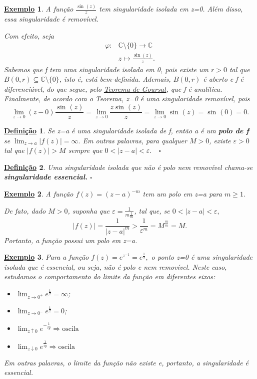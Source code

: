 \documentclass{article}
\newtheorem*{def*}{\underline{Defini\c c\~ao}}
\newtheorem{example}{\underline{Exemplo}}[section]
\begin{document}
  \begin{example}
    A função \(\frac{\sin^{}{(z)}}{z}\) tem singularidade isolada em z=0. Além disso, essa singularidade é removível.

    Com efeito, seja 
    \begin{align*}
      \varphi :&\mathbb{C}\setminus{\{0\}}\rightarrow \mathbb{C}\\
               &z\mapsto \frac{\sin{(z)}}{z}.
    \end{align*}
    Sabemos que f tem uma singularidade isolada em 0, pois existe um \(r > 0\) tal que \(B(0, r)\subseteq \mathbb{C}\setminus{\{0\}}\), isto é, está bem-definida. Ademais, \(B(0, r)\) é aberto 
    e f é diferenciável, do que segue, pelo \hyperlink{goursat}{Teorema de Goursat}, que f é analítica. Finalmente, de acordo com o Teorema, z=0 é uma singularidade removível, pois 
    \[
      \lim_{z\to 0}(z-0)\frac{\sin^{}{(z)}}{z} = \lim_{z\to 0}\frac{z\sin^{}{(z)}}{z} = \lim_{z\to 0}\sin^{}{(z)} = \sin^{}{(0)} = 0.
    \]
  \end{example}
  \begin{def*}
    Se z=a é uma singularidade isolada de f, então a é um \textbf{polo de f} se \(\lim_{z\to a}|f(z)| = \infty.\) Em outras palavras,
    para qualquer \(M > 0\), existe \(\varepsilon > 0\) tal que \(|f(z)| > M\) sempre que \(0 < |z-a| < \varepsilon .\quad \square\) 
  \end{def*}
  \begin{def*}
    Uma singularidade isolada que não é polo nem removível chama-se \textbf{singularidade essencial.} \(\square\)
  \end{def*}
  \begin{example}
    A função \(f(z) = (z-a)^{-m}\) tem um polo em z=a para \(m\geq 1\).

    De fato, dado \(M > 0\), suponha que \(\varepsilon  = \frac{1}{m \frac{1}{m}}\), tal que, se \(0 < |z-a| < \varepsilon ,\)
    \[
      |f(z)| = \frac{1}{|z-a|^{m}}> \frac{1}{\varepsilon ^{m}} = M^{\frac{m}{m}} = M.
    \]
    Portanto, a função possui um polo em z=a.
  \end{example}
  \begin{example}
    Para a função \(f(z) = e^{z^{-1}} = e^{\frac{1}{z}},\) o ponto z=0 é uma singularidade isolada que é essencial, ou seja, não é polo e nem removível. Neste caso, estudamos o comportamento do limite
    da função em diferentes eixos:
    \begin{itemize}
      \item \(\lim_{z\to 0^{+}}e^{\frac{1}{z}} = \infty\);
      \item \(\lim_{z\to 0^{-}}e^{\frac{1}{z}} = 0\);
      \item \(\lim_{z \uparrow 0}e^{-\frac{1}{iy}} \Rightarrow \text{oscila}\)
      \item \(\lim_{z \downarrow 0}e^{\frac{1}{iy}} \Rightarrow \text{oscila}\)
    \end{itemize}
    Em outras palavras, o limite da função não existe e, portanto, a singularidade é essencial.
  \end{example}
\end{document}
